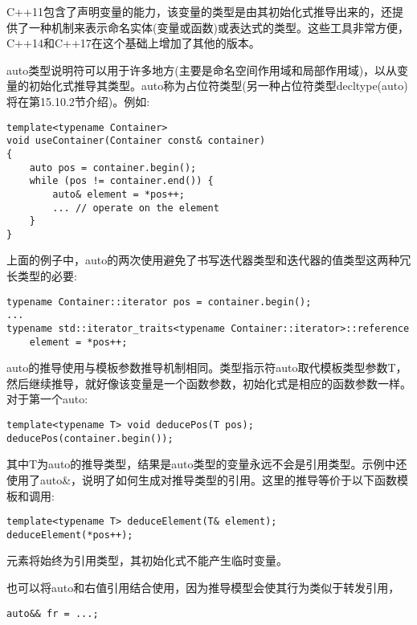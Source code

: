
C++11包含了声明变量的能力，该变量的类型是由其初始化式推导出来的，还提供了一种机制来表示命名实体(变量或函数)或表达式的类型。这些工具非常方便，C++14和C++17在这个基础上增加了其他的版本。


auto类型说明符可以用于许多地方(主要是命名空间作用域和局部作用域)，以从变量的初始化式推导其类型。auto称为占位符类型(另一种占位符类型decltype(auto)将在第15.10.2节介绍)。例如:

\begin{lstlisting}[style=styleCXX]
template<typename Container>
void useContainer(Container const& container)
{
	auto pos = container.begin();
	while (pos != container.end()) {
		auto& element = *pos++;
		... // operate on the element
	}
}
\end{lstlisting}

上面的例子中，auto的两次使用避免了书写迭代器类型和迭代器的值类型这两种冗长类型的必要:

\begin{lstlisting}[style=styleCXX]
typename Container::iterator pos = container.begin();
...
typename std::iterator_traits<typename Container::iterator>::reference
	element = *pos++;
\end{lstlisting}

auto的推导使用与模板参数推导机制相同。类型指示符auto取代模板类型参数T，然后继续推导，就好像该变量是一个函数参数，初始化式是相应的函数参数一样。对于第一个auto:

\begin{lstlisting}[style=styleCXX]
template<typename T> void deducePos(T pos);
deducePos(container.begin());
\end{lstlisting}

其中T为auto的推导类型，结果是auto类型的变量永远不会是引用类型。示例中还使用了auto\&，说明了如何生成对推导类型的引用。这里的推导等价于以下函数模板和调用:

\begin{lstlisting}[style=styleCXX]
template<typename T> deduceElement(T& element);
deduceElement(*pos++);
\end{lstlisting}

元素将始终为引用类型，其初始化式不能产生临时变量。

也可以将auto和右值引用结合使用，因为推导模型会使其行为类似于转发引用，

\begin{lstlisting}[style=styleCXX]
auto&& fr = ...;
\end{lstlisting}

